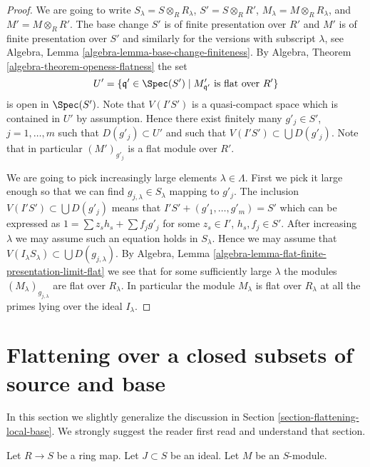 \begin{proof}
We are going to write $S_\lambda = S \otimes_R R_\lambda$,
$S' = S \otimes_R R'$, $M_\lambda = M \otimes_R R_\lambda$, and
$M' = M \otimes_R R'$.
The base change $S'$ is of finite presentation over $R'$ and
$M'$ is of finite presentation over $S'$ and similarly for the
versions with subscript $\lambda$, see
Algebra, Lemma \ref{algebra-lemma-base-change-finiteness}.
By
Algebra, Theorem \ref{algebra-theorem-openess-flatness}
the set
$$
U' = \{\mathfrak q' \in \Spec(S') \mid
M'_{\mathfrak q'}\text{ is flat over }R'\}
$$
is open in $\Spec(S')$. Note that $V(I'S')$ is a quasi-compact space
which is contained in $U'$ by assumption. Hence there exist finitely many
$g'_j \in S'$, $j = 1, \ldots, m$ such that $D(g'_j) \subset U'$ and such
that $V(I'S') \subset \bigcup D(g'_j)$.
Note that in particular $(M')_{g'_j}$ is a flat module over $R'$.

\medskip\noindent
We are going to pick increasingly large elements $\lambda \in \Lambda$.
First we pick it large enough so that we can find
$g_{j, \lambda} \in S_{\lambda}$ mapping to $g'_j$.
The inclusion $V(I'S') \subset \bigcup D(g'_j)$ means that
$I'S' + (g'_1, \ldots, g'_m) = S'$ which can be expressed as
$1 = \sum z_sh_s + \sum f_jg'_j$ for some $z_s \in I'$, $h_s, f_j \in S'$.
After increasing $\lambda$ we may assume such an equation holds in
$S_\lambda$. Hence we may assume that
$V(I_\lambda S_\lambda) \subset \bigcup D(g_{j, \lambda})$. By
Algebra, Lemma \ref{algebra-lemma-flat-finite-presentation-limit-flat}
we see that for some sufficiently large $\lambda$ the modules
$(M_\lambda)_{g_{j, \lambda}}$ are flat over $R_\lambda$.
In particular the module $M_\lambda$ is flat over $R_\lambda$
at all the primes lying over the ideal $I_\lambda$.
\end{proof}









\section{Flattening over a closed subsets of source and base}
\label{section-flattening-local-source-base}

\noindent
In this section we slightly generalize the discussion in
Section \ref{section-flattening-local-base}.
We strongly suggest the reader first read and understand
that section.

\begin{situation}
\label{situation-flattening-general}
Let $R \to S$ be a ring map. Let $J \subset S$ be an ideal.
Let $M$ be an $S$-module.
\end{situation}

